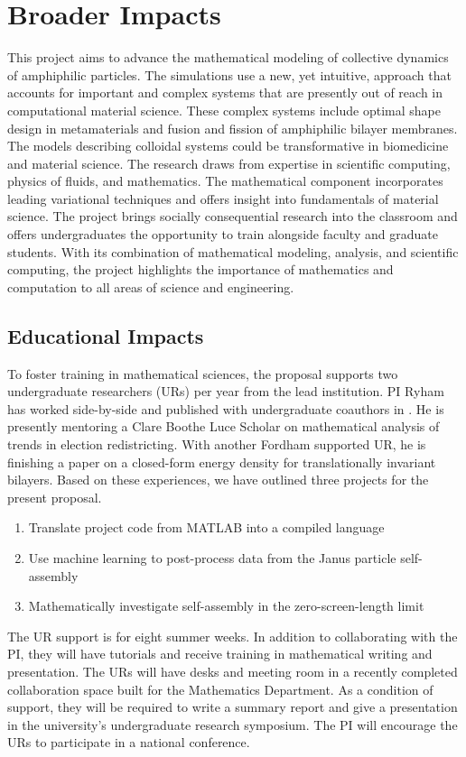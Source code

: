 \section{Broader Impacts}
\label{sec:BroaderImpacts}
This project aims to advance the mathematical modeling of collective dynamics of amphiphilic particles. The simulations use a new, yet intuitive, approach that accounts for important and complex systems that are presently out of reach in computational material science. These complex systems include optimal shape design in metamaterials and fusion and fission of amphiphilic bilayer membranes. The models describing colloidal systems could be transformative in biomedicine and material science. The research draws from expertise in scientific computing, physics of fluids, and mathematics. The mathematical component incorporates leading variational techniques and offers insight into fundamentals of material science. The project brings socially consequential research into the classroom and offers 
undergraduates the opportunity to train alongside faculty and graduate students. With its combination of mathematical modeling, analysis, and scientific computing, the project highlights the importance of mathematics and computation to all areas of science and engineering.


\subsection{Educational Impacts}
\label{subsec:Educational_plans}
To foster training in mathematical sciences,
the proposal supports two undergraduate researchers (URs) per year
from the lead institution.
PI Ryham has worked side-by-side and
published with undergraduate coauthors in
\cite{RYHAM20112929, RyWaCo13, RyKlYaCo16}.
He is presently mentoring a Clare Boothe Luce Scholar 
on mathematical analysis of trends in election redistricting.
With another Fordham supported UR,
he is finishing a paper on a closed-form 
energy density for translationally invariant bilayers. 
Based on these experiences, we have outlined three projects for the present proposal.
\begin{enumerate}[noitemsep,topsep=0pt]
\item Translate project code from MATLAB into a compiled language   

\item Use machine learning to post-process data from the Janus particle self-assembly

\item Mathematically investigate self-assembly in the zero-screen-length limit
  
\end{enumerate}
The UR support is for eight summer weeks. 
In addition to collaborating with the PI,
they will have tutorials and receive training in
mathematical writing and presentation.
The URs will have desks and meeting room
in a recently completed collaboration space
built for the Mathematics Department. 
As a condition of support, 
they will be required to write a summary report and
give a presentation in the university's undergraduate
research symposium.  The PI 
will encourage the
URs to participate in a national conference.

